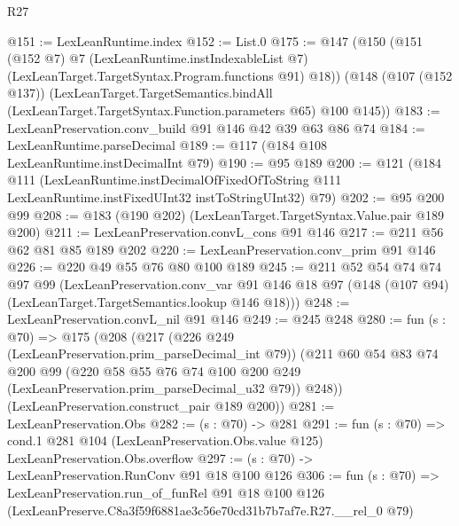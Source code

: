 \begin{lexlean}{R27}
\begin{coremodule}
@151 := LexLeanRuntime.index
@152 := List.{0}
@175 := @147
    (@150
      (@151
        (@152 @7)
        @7
        (LexLeanRuntime.instIndexableList @7)
        (LexLeanTarget.TargetSyntax.Program.functions @91)
        @18))
    (@148
      (@107 (@152 @137))
      (LexLeanTarget.TargetSemantics.bindAll
        (LexLeanTarget.TargetSyntax.Function.parameters @65)
        @100
        @145))
@183 := LexLeanPreservation.conv_build @91 @146 @42 @39 @63 @86 @74
@184 := LexLeanRuntime.parseDecimal
@189 := @117 (@184 @108 LexLeanRuntime.instDecimalInt @79)
@190 := @95 @189
@200 := @121
    (@184
      @111
      (LexLeanRuntime.instDecimalOfFixedOfToString
        @111
        LexLeanRuntime.instFixedUInt32
        instToStringUInt32)
      @79)
@202 := @95 @200 @99
@208 := @183 (@190 @202) (LexLeanTarget.TargetSyntax.Value.pair @189 @200)
@211 := LexLeanPreservation.convL_cons @91 @146
@217 := @211 @56 @62 @81 @85 @189 @202
@220 := LexLeanPreservation.conv_prim @91 @146
@226 := @220 @49 @55 @76 @80 @100 @189
@245 := @211
    @52
    @54
    @74
    @74
    @97
    @99
    (LexLeanPreservation.conv_var
      @91
      @146
      @18
      @97
      (@148 (@107 @94) (LexLeanTarget.TargetSemantics.lookup @146 @18)))
@248 := LexLeanPreservation.convL_nil @91 @146
@249 := @245 @248
@280 := fun (s : @70) =>
  @175
    (@208
      (@217
        (@226 @249 (LexLeanPreservation.prim_parseDecimal_int @79))
        (@211
          @60
          @54
          @83
          @74
          @200
          @99
          (@220 @58 @55 @76 @74 @100 @200 @249 (LexLeanPreservation.prim_parseDecimal_u32 @79))
          @248))
      (LexLeanPreservation.construct_pair @189 @200))
@281 := LexLeanPreservation.Obs
@282 := (s : @70) -> @281
@291 := fun (s : @70) =>
  cond.{1} @281 @104 (LexLeanPreservation.Obs.value @125) LexLeanPreservation.Obs.overflow
@297 := (s : @70) -> LexLeanPreservation.RunConv @91 @18 @100 @126
@306 := fun (s : @70) =>
  LexLeanPreservation.run_of_funRel
    @91
    @18
    @100
    @126
    (LexLeanPreserve.C8a3f59f6881ae3c56e70cd31b7b7af7e.R27.__rel_0 @79)
\end{coremodule}
\end{lexlean}
